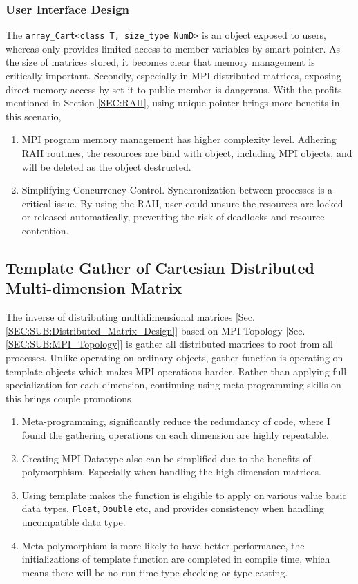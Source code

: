 \subsubsection{User Interface Design}
The \texttt{array\_Cart<class T, size\_type NumD>} is an object exposed to users, whereas only provides limited access to member variables by smart pointer.
As the size of matrices stored, it becomes clear that memory management is critically important. 
Secondly, especially in MPI distributed matrices, exposing direct memory access by set it to public member is dangerous. 
With the profits mentioned in Section \ref{SEC:RAII}, using unique pointer brings more benefits in this scenario, 
\begin{enumerate}
  \item MPI program memory management has higher complexity level. 
  Adhering RAII routines, the resources are bind with object, including MPI objects, and will be deleted as the object destructed. 
  \item Simplifying Concurrency Control. Synchronization between processes is a critical issue. 
  By using the RAII, user could unsure the resources are locked or released automatically, preventing the risk of deadlocks and resource contention.
\end{enumerate}



\subsection{Template Gather of Cartesian Distributed Multi-dimension Matrix}
The inverse of distributing multidimensional matrices 
[Sec. \ref{SEC:SUB:Distributed_Matrix_Design}]
based on MPI Topology 
[Sec. \ref{SEC:SUB:MPI_Topology}] 
is gather all distributed matrices to root from all processes.
Unlike operating on ordinary objects, gather function is operating on template objects which makes MPI operations harder.
Rather than applying full specialization for each dimension, continuing using meta-programming skills on this brings couple promotions
\begin{enumerate}
  \item Meta-programming, significantly reduce the redundancy of code, where I found the gathering operations on each dimension are highly repeatable. 
  \item Creating MPI Datatype also can be simplified due to the benefits of polymorphism. Especially when handling the high-dimension matrices.
  \item Using template makes the function is eligible to apply on various value basic data types, \texttt{Float}, \texttt{Double} etc, and provides consistency when handling uncompatible data type.
  \item Meta-polymorphism is more likely to have better performance, the initializations of template function are completed in compile time, which means there will be no run-time type-checking or type-casting.
\end{enumerate}


